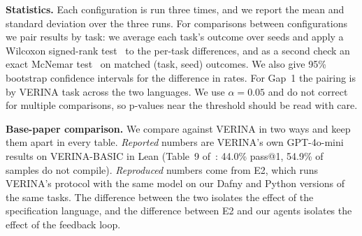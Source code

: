 \textbf{Statistics.} Each configuration is run three times, and we report the mean and standard deviation over the three runs. For comparisons between configurations we pair results by task: we average each task's outcome over seeds and apply a Wilcoxon signed-rank test~\cite{wilcoxon1945individual} to the per-task differences, and as a second check an exact McNemar test~\cite{mcnemar1947note} on matched (task, seed) outcomes. We also give 95\% bootstrap confidence intervals for the difference in rates. For Gap~1 the pairing is by VERINA task across the two languages. We use $\alpha = 0.05$ and do not correct for multiple comparisons, so p-values near the threshold should be read with care.

\textbf{Base-paper comparison.} We compare against VERINA in two ways and keep them apart in every table. \emph{Reported} numbers are VERINA's own GPT-4o-mini results on VERINA-BASIC in Lean (Table~9 of~\cite{ye2026verina}: 44.0\% pass@1, 54.9\% of samples do not compile). \emph{Reproduced} numbers come from E2, which runs VERINA's protocol with the same model on our Dafny and Python versions of the same tasks. The difference between the two isolates the effect of the specification language, and the difference between E2 and our agents isolates the effect of the feedback loop.

